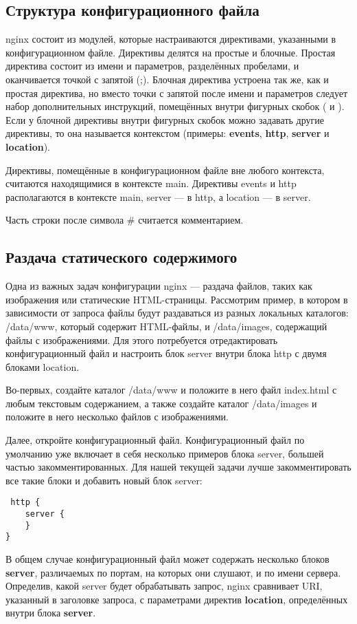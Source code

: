 \documentclass[a4paper,10pt,twoside]{article}
\begin{document}
\subsection{Структура конфигурационного файла}
nginx состоит из модулей, которые настраиваются директивами, указанными в конфигурационном файле. Директивы делятся на простые и блочные. Простая директива состоит из имени и параметров, разделённых пробелами, и оканчивается точкой с запятой (;). Блочная директива устроена так же, как и простая директива, но вместо точки с запятой после имени и параметров следует набор дополнительных инструкций, помещённых внутри фигурных скобок ({ и }). Если у блочной директивы внутри фигурных скобок можно задавать другие директивы, то она называется контекстом (примеры: \textbf{events}, \textbf{http}, \textbf{server} и \textbf{location}).

Директивы, помещённые в конфигурационном файле вне любого контекста, считаются находящимися в контексте main. Директивы events и http располагаются в контексте main, server — в http, а location — в server.

Часть строки после символа \# считается комментарием.

\subsection{Раздача статического содержимого}
Одна из важных задач конфигурации nginx — раздача файлов, таких как изображения или статические HTML-страницы. Рассмотрим пример, в котором в зависимости от запроса файлы будут раздаваться из разных локальных каталогов: /data/www, который содержит HTML-файлы, и /data/images, содержащий файлы с изображениями. Для этого потребуется отредактировать конфигурационный файл и настроить блок server внутри блока http с двумя блоками location.

Во-первых, создайте каталог /data/www и положите в него файл index.html с любым текстовым содержанием, а также создайте каталог /data/images и положите в него несколько файлов с изображениями.

Далее, откройте конфигурационный файл. Конфигурационный файл по умолчанию уже включает в себя несколько примеров блока server, большей частью закомментированных. Для нашей текущей задачи лучше закомментировать все такие блоки и добавить новый блок server:

\begin{verbatim}
 http {
    server {
    }
}
\end{verbatim} 
В общем случае конфигурационный файл может содержать несколько блоков \textbf{server}, различаемых по портам, на которых они слушают, и по имени сервера. Определив, какой server будет обрабатывать запрос, nginx сравнивает URI, указанный в заголовке запроса, с параметрами директив \textbf{location}, определённых внутри блока \textbf{server}.
\end{document}

